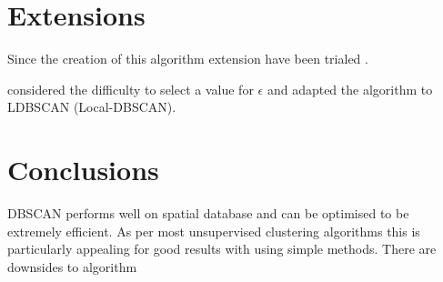 \documentclass{ecsarticle}     %
\begin{document}
\section{Extensions}
Since the creation of this algorithm extension have been trialed . 

\cite{lian07ldbscan} considered the difficulty to select a value for $\epsilon$ and adapted the algorithm to LDBSCAN (Local-DBSCAN).

\section{Conclusions}
DBSCAN performs well on spatial database and can be optimised to be extremely efficient.
As per most unsupervised clustering algorithms this is particularly appealing for good results with using simple methods. 
There are downsides to algorithm



\end{document}
